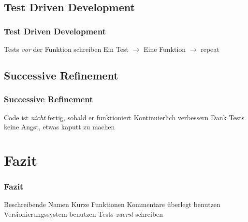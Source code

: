 \documentclass[handout]{beamer}
\begin{document}
\subsection{Test Driven Development}
\begin{frame}
    \frametitle{Test Driven Development}
    \begin{outline}
        \1 Tests \emph{vor} der Funktion schreiben
        \1 Ein Test $\rightarrow$ Eine Funktion $\rightarrow$ repeat
    \end{outline}
\end{frame}
\subsection{Successive Refinement}
\begin{frame}
    \frametitle{Successive Refinement}
    \begin{outline}
        \1 Code ist \emph{nicht} fertig, sobald er funktioniert
        \1 Kontinuierlich verbessern
        \1 Dank Tests keine Angst, etwas kaputt zu machen
    \end{outline}
\end{frame}

\section{Fazit}
\begin{frame}
    \frametitle{Fazit}
    \begin{outline}
        \1 Beschreibende Namen
        \1 Kurze Funktionen
        \1 Kommentare überlegt benutzen
        \1 Versionierungssystem benutzen
        \1 Tests \emph{zuerst} schreiben
    \end{outline}
\end{frame}
\end{document}
